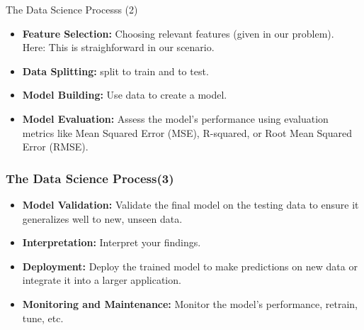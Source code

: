 \documentclass{beamer}
\newcounter{slidenum}
\begin{document}
\begin{frame}{The Data Science Processs (2)}
	\begin{itemize}	
  \item \textbf{Feature Selection:} Choosing relevant features (given in our
	  problem).\\

	  Here: This is straighforward in our scenario. 
  \item \textbf{Data Splitting:} split to train and to test.

  \item \textbf{Model Building:} Use data to create a model. 
  \item \textbf{Model Evaluation:} Assess the model's performance using evaluation metrics like Mean Squared Error (MSE), R-squared, or Root Mean Squared Error (RMSE).
	  \end{itemize}
\end{frame}

\begin{frame}
	
	\frametitle{The Data Science Process(3)}
	{\small
	\begin{itemize}
		
  \item \textbf{Model Validation:} Validate the final model on the testing data to ensure it generalizes well to new, unseen data.

  \item \textbf{Interpretation:} Interpret your findings. 

  \item \textbf{Deployment:} Deploy the trained model to make predictions on new data or integrate it into a larger application.

 \item \textbf{Monitoring and Maintenance:} Monitor the model's performance, retrain, tune, etc.
\end{itemize}
}
\end{frame}
\end{document}
